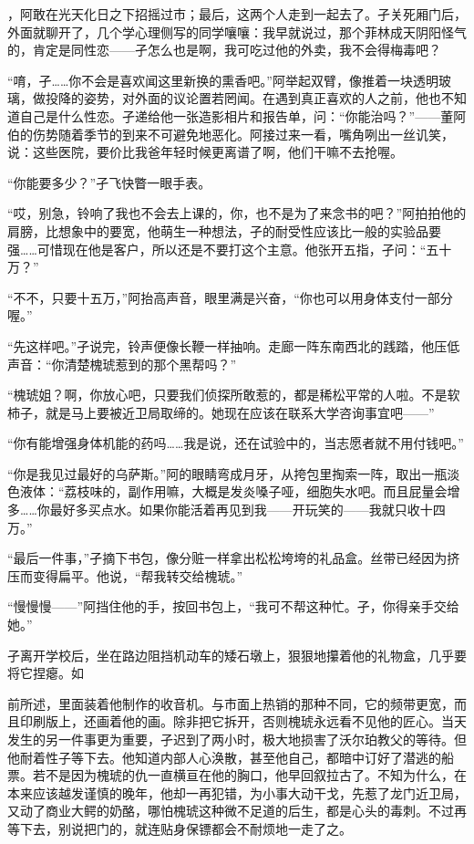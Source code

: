 \documentclass{article}
\begin{document}
\newpage 

，阿敢在光天化日之下招摇过市；最后，这两个人走到一起去了。孑关死厢门后，外面就聊开了，几个学心理侧写的同学嚷嚷：我早就说过，那个菲林成天阴阳怪气的，肯定是同性恋——孑怎么也是啊，我可吃过他的外卖，我不会得梅毒吧？

“唷，孑……你不会是喜欢闻这里新换的熏香吧。”阿举起双臂，像推着一块透明玻璃，做投降的姿势，对外面的议论置若罔闻。在遇到真正喜欢的人之前，他也不知道自己是什么性恋。孑递给他一张造影相片和报告单，问：“你能治吗？”——董阿伯的伤势随着季节的到来不可避免地恶化。阿接过来一看，嘴角咧出一丝讥笑，说：这些医院，要价比我爸年轻时候更离谱了啊，他们干嘛不去抢喔。

“你能要多少？”孑飞快瞥一眼手表。

“哎，别急，铃响了我也不会去上课的，你，也不是为了来念书的吧？”阿拍拍他的肩膀，比想象中的要宽，他萌生一种想法，孑的耐受性应该比一般的实验品要强……可惜现在他是客户，所以还是不要打这个主意。他张开五指，孑问：“五十万？”

“不不，只要十五万，”阿抬高声音，眼里满是兴奋，“你也可以用身体支付一部分喔。”

\newpage 



“先这样吧。”孑说完，铃声便像长鞭一样抽响。走廊一阵东南西北的践踏，他压低声音：“你清楚槐琥惹到的那个黑帮吗？”

“槐琥姐？啊，你放心吧，只要我们侦探所敢惹的，都是稀松平常的人啦。不是软柿子，就是马上要被近卫局取缔的。她现在应该在联系大学咨询事宜吧——”

“你有能增强身体机能的药吗……我是说，还在试验中的，当志愿者就不用付钱吧。”

“你是我见过最好的乌萨斯。”阿的眼睛弯成月牙，从挎包里掏索一阵，取出一瓶淡色液体：“荔枝味的，副作用嘛，大概是发炎嗓子哑，细胞失水吧。而且屁量会增多……你最好多买点水。如果你能活着再见到我——开玩笑的——我就只收十四万。”

“最后一件事，”孑摘下书包，像分赃一样拿出松松垮垮的礼品盒。丝带已经因为挤压而变得扁平。他说，“帮我转交给槐琥。”

“慢慢慢——”阿挡住他的手，按回书包上，“我可不帮这种忙。孑，你得亲手交给她。”

孑离开学校后，坐在路边阻挡机动车的矮石墩上，狠狠地攥着他的礼物盒，几乎要将它捏瘪。如

\newpage 

前所述，里面装着他制作的收音机。与市面上热销的那种不同，它的频带更宽，而且印刷版上，还画着他的画。除非把它拆开，否则槐琥永远看不见他的匠心。当天发生的另一件事更为重要，孑迟到了两小时，极大地损害了沃尔珀教父的等待。但他耐着性子等下去。他知道内部人心涣散，甚至他自己，都暗中订好了潜逃的船票。若不是因为槐琥的仇一直横亘在他的胸口，他早回叙拉古了。不知为什么，在本来应该越发谨慎的晚年，他却一再犯错，为小事大动干戈，先惹了龙门近卫局，又动了商业大鳄的奶酪，哪怕槐琥这种微不足道的后生，都是心头的毒刺。不过再等下去，别说把门的，就连贴身保镖都会不耐烦地一走了之。
\end{document}
